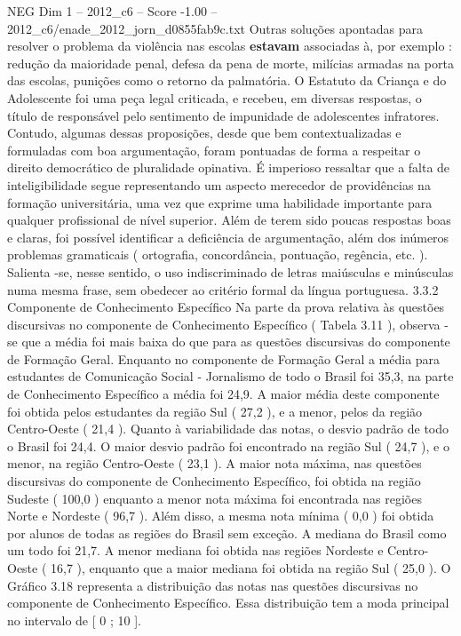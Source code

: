 \begin{textsample}{NEG Dim 1 – 2012\_c6 – Score -1.00 – 2012\_c6/enade\_2012\_jorn\_d0855fab9c.txt}
Outras soluções apontadas para resolver o problema da violência nas escolas \textbf{estavam} associadas à, por exemplo : redução da maioridade penal, defesa da pena de morte, milícias armadas na porta das escolas, punições como o retorno da palmatória.
O Estatuto da Criança e do Adolescente foi uma peça legal criticada, e recebeu, em diversas respostas, o título de responsável pelo sentimento de impunidade de adolescentes infratores.
Contudo, algumas dessas proposições, desde que bem contextualizadas e formuladas com boa argumentação, foram pontuadas de forma a respeitar o direito democrático de pluralidade opinativa.
É imperioso ressaltar que a falta de inteligibilidade segue representando um aspecto merecedor de providências na formação universitária, uma vez que exprime uma habilidade importante para qualquer profissional de nível superior.
Além de terem sido poucas respostas boas e claras, foi possível identificar a deficiência de argumentação, além dos inúmeros problemas gramaticais ( ortografia, concordância, pontuação, regência, etc. ).
Salienta -se, nesse sentido, o uso indiscriminado de letras maiúsculas e minúsculas numa mesma frase, sem obedecer ao critério formal da língua portuguesa. 3.3.2 Componente de Conhecimento Específico Na parte da prova relativa às questões discursivas no componente de Conhecimento Específico ( Tabela 3.11 ), observa -se que a média foi mais baixa do que para as questões discursivas do componente de Formação Geral.
Enquanto no componente de Formação Geral a média para estudantes de Comunicação Social - Jornalismo de todo o Brasil foi 35,3, na parte de Conhecimento Específico a média foi 24,9.
A maior média deste componente foi obtida pelos estudantes da região Sul ( 27,2 ), e a menor, pelos da região Centro-Oeste ( 21,4 ).
Quanto à variabilidade das notas, o desvio padrão de todo o Brasil foi 24,4.
O maior desvio padrão foi encontrado na região Sul ( 24,7 ), e o menor, na região Centro-Oeste ( 23,1 ).
A maior nota máxima, nas questões discursivas do componente de Conhecimento Específico, foi obtida na região Sudeste ( 100,0 ) enquanto a menor nota máxima foi encontrada nas regiões Norte e Nordeste ( 96,7 ).
Além disso, a mesma nota mínima ( 0,0 ) foi obtida por alunos de todas as regiões do Brasil sem exceção.
A mediana do Brasil como um todo foi 21,7.
A menor mediana foi obtida nas regiões Nordeste e Centro-Oeste ( 16,7 ), enquanto que a maior mediana foi obtida na região Sul ( 25,0 ).
O Gráfico 3.18 representa a distribuição das notas nas questões discursivas no componente de Conhecimento Específico.
Essa distribuição tem a moda principal no intervalo de [ 0 ; 10 ].

\end{textsample}
